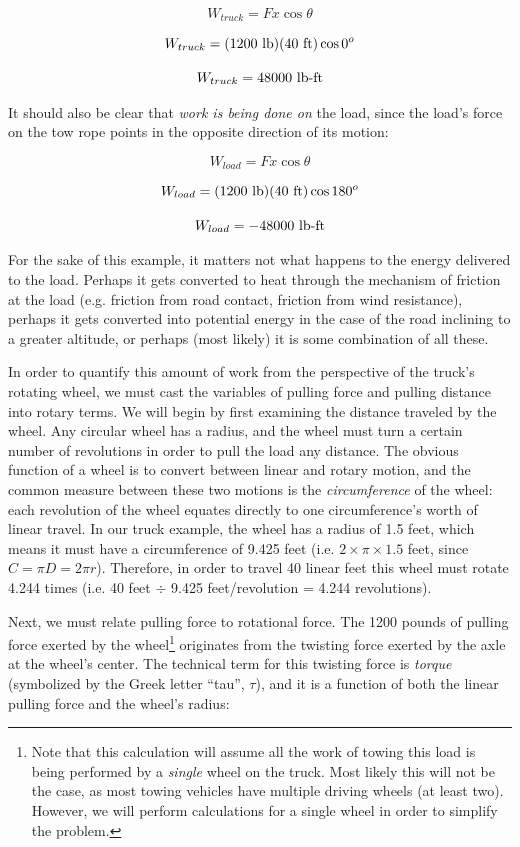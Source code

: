 $$W_{truck} = Fx \cos \theta$$

$$W_{truck} = (1200 \hbox{ lb}) (40 \hbox{ ft}) \cos 0^o$$

$$W_{truck} = 48000 \hbox{ lb-ft}$$

It should also be clear that \textit{work is being done on} the load, since the load's force on the tow rope points in the opposite direction of its motion:

$$W_{load} = Fx \cos \theta$$

$$W_{load} = (1200 \hbox{ lb}) (40 \hbox{ ft}) \cos 180^o$$

$$W_{load} = -48000 \hbox{ lb-ft}$$

For the sake of this example, it matters not what happens to the energy delivered to the load.  Perhaps it gets converted to heat through the mechanism of friction at the load (e.g. friction from road contact, friction from wind resistance), perhaps it gets converted into potential energy in the case of the road inclining to a greater altitude, or perhaps (most likely) it is some combination of all these.

\vskip 10pt

\filbreak

In order to quantify this amount of work from the perspective of the truck's rotating wheel, we must cast the variables of pulling force and pulling distance into rotary terms.  We will begin by first examining the distance traveled by the wheel.  Any circular wheel has a radius, and the wheel must turn a certain number of revolutions in order to pull the load any distance.  The obvious function of a wheel is to convert between linear and rotary motion, and the common measure between these two motions is the \textit{circumference} of the wheel: each revolution of the wheel equates directly to one circumference's worth of linear travel.  In our truck example, the wheel has a radius of 1.5 feet, which means it must have a circumference of 9.425 feet (i.e. $2 \times \pi \times 1.5$ feet, since $C = \pi D = 2 \pi r$).  Therefore, in order to travel 40 linear feet this wheel must rotate 4.244 times (i.e. 40 feet $\div$ 9.425 feet/revolution = 4.244 revolutions).

Next, we must relate pulling force to rotational force.  The 1200 pounds of pulling force exerted by the wheel\footnote{Note that this calculation will assume all the work of towing this load is being performed by a \textit{single} wheel on the truck.  Most likely this will not be the case, as most towing vehicles have multiple driving wheels (at least two).  However, we will perform calculations for a single wheel in order to simplify the problem.} originates from the twisting force exerted by the axle at the wheel's center.  The technical term for this twisting force is \textit{torque} (symbolized by the Greek letter ``tau'', $\tau$), and it is a function of both the linear pulling force and the wheel's radius:  

